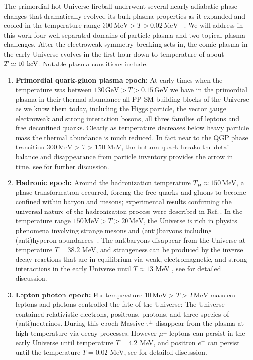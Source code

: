 

The primordial hot Universe fireball underwent several nearly adiabatic phase changes that dramatically evolved its bulk plasma properties as it expanded and cooled in the temperature range $300\,\mathrm{MeV}>T>0.02\,\mathrm{MeV}$ ~\cite{Rafelski:2023emw}. We will address in this work four well separated domains of particle plasma and two topical plasma challenges. After the electroweak symmetry breaking sets in,  the comic plasma in the early Universe evolves in the first hour down to temperature of about $T\simeq 10\text{ keV}$. Notable plasma conditions include:
\begin{enumerate}
\item \textbf{Primordial quark-gluon plasma epoch:}  
At early times when the temperature was between $130\,\mathrm{GeV}>T>0.15\,\mathrm{GeV}$ we have in the primordial plasma in their thermal abundance all PP-SM  building blocks of the Universe as we know them today, including the Higgs particle, the vector gauge electroweak and strong interaction bosons, all three families of leptons and free deconfined quarks. Clearly as temperature decreases below heavy particle mass the thermal abundance is much reduced. In fact near to the QGP phase transition $300\, \mathrm{MeV}>T>150$ MeV, the bottom quark breaks the detail balance and disappearance from particle inventory provides the arrow in time, see  for further discussion. 
%
\item \textbf{Hadronic epoch:}  Around the hadronization temperature $T_H\approx150\,\mathrm{MeV}$, a phase transformation occurred, forcing the free quarks and gluons to become confined within baryon and mesons; experimental results confirming the universal nature of the hadronization process were described in Ref.\,\cite{Letessier:2005qe}. In the temperature range $ 150\,\mathrm{MeV}>T>20\,\mathrm{MeV}$, the Universe is rich in physics phenomena involving strange mesons and (anti)baryons including (anti)hyperon abundances~\cite{Fromerth:2012fe,Yang:2021bko}. The antibaryons disappear from the Universe at temperature $T=38.2$ MeV, and strangeness can be produced by the inverse decay reactions that are in equilibrium via weak, electromagnetic, and strong interactions in the early Universe until $T\approx13$ MeV , see  for detailed discussion.
%
\item \textbf{Lepton-photon epoch:}  For temperature $10\,\mathrm{MeV}>T>2\,\mathrm{MeV}$ massless leptons and photons controlled the fate of the Universe: The Universe contained relativistic electrons, positrons, photons, and three species of (anti)neutrinos. During this epoch Massive $\tau^\pm$ disappear from the plasma at high temperature via decay processes. However $\mu^\pm$ leptons can persist in the early Universe until temperature $T=4.2$ MeV, and positron $e^+$ can persist until the temperature $T=0.02$ MeV, see  for detailed discussion.


\end{enumerate}
